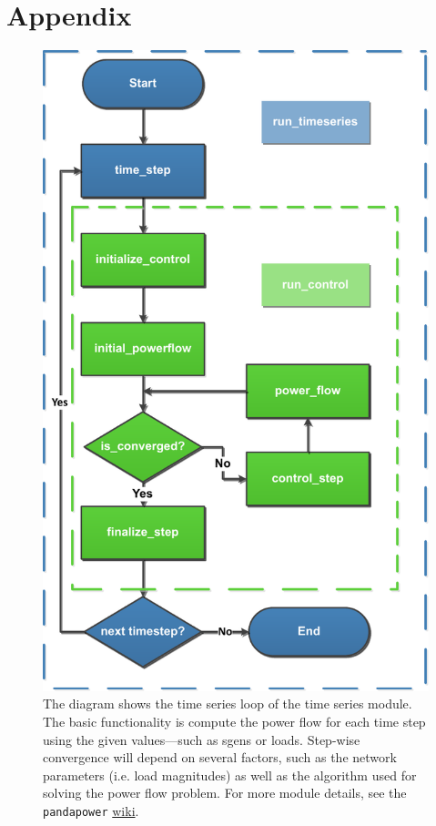 \documentclass[a4paper,10pt]{report}
\begin{document}
\chapter*{Appendix}\label{chapter_appendix}

\begin{figure}[htpb]
	\centering
	\includegraphics[width=0.45\linewidth]{timeseries_module_diag.pdf}
	\caption{The diagram shows the time series loop of the time series module. The basic functionality is compute the power flow for each time step using the given values---such as sgens or loads. Step-wise convergence will depend on several factors, such as the network parameters (i.e. load magnitudes) as well as the algorithm used for solving the power flow problem. For more module details, see the \texttt{pandapower}  \href{https://pandapower.readthedocs.io/en/v2.10.1/timeseries/timeseries_loop.html}{wiki}.}
	\label{timeseries_module_diag}
\end{figure}
\end{document}
